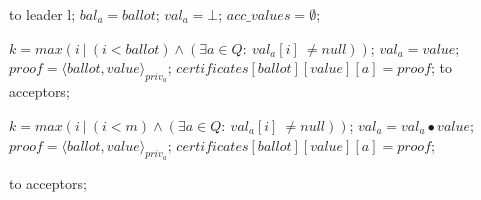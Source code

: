 \begin{algorithm}
\begin{algorithmic}[1]
		\State
		\State {} to leader l;
		\State $bal_a = ballot$;	
		\State $val_a = \bot$;	
		\State $acc\_values = \emptyset$;		
		\EndIf
		\EndFunction
	
		\State
		\State $k = max(i\ |\ (i < ballot) \wedge (\exists a \in Q :\ val_a[i]\ \neq null))$;
		\State $val_a = value$;
		\State $proof = \langle ballot, value \rangle_{priv_a}$;
		\State $certificates[ballot][value][a] = proof$;
		\State {} to acceptors;
		\EndIf
		\EndFunction
		
		\State
		\State $k = max(i\ |\ (i < m) \wedge (\exists a \in Q :\ val_a[i]\ \neq null))$;
		\State $val_a =  val_a \bullet value$;
		\State $proof = \langle ballot, value \rangle_{priv_a}$;
		\State $certificates[ballot][value][a] = proof$;

		\State {} to acceptors;
		\EndIf
		\EndFunction
	\end{algorithmic}
\end{algorithm}

